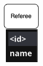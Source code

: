 \documentclass{Configuration_Files/PoliMi3i_thesis}
\begin{document}
\begin{figure}[htbp]
  \vspace{1em}
  
  \begin{subfigure}[b]{0.12\linewidth}
    \includegraphics[width=\linewidth]{Project Template/Images/entities/ref.drawio.png}
  \end{subfigure}
  \hfill
  \begin{subfigure}[b]{0.24\linewidth}

\end{subfigure}
\end{figure}
\end{document}
